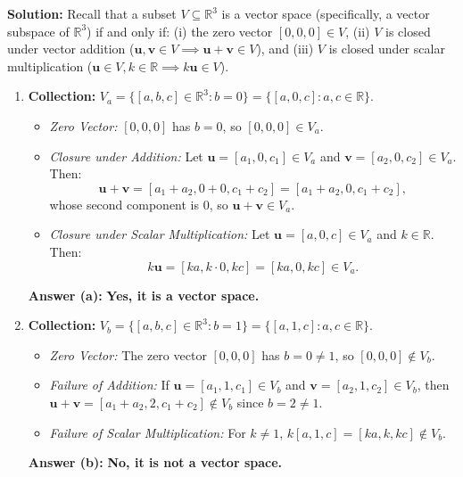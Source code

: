 \documentclass[11pt,a4paper]{article}
\begin{document}
\textbf{Solution:}
Recall that a subset $V \subseteq \mathbb{R}^3$ is a vector space (specifically, a vector subspace of $\mathbb{R}^3$) if and only if: (i) the zero vector $[0, 0, 0] \in V$, (ii) $V$ is closed under vector addition ($\mathbf{u}, \mathbf{v} \in V \implies \mathbf{u} + \mathbf{v} \in V$), and (iii) $V$ is closed under scalar multiplication ($\mathbf{u} \in V, k \in \mathbb{R} \implies k\mathbf{u} \in V$).

\begin{enumerate}[label=(\alph*)]
    \item \textbf{Collection:} $V_a = \{[a, b, c] \in \mathbb{R}^3 : b = 0\} = \{[a, 0, c] : a, c \in \mathbb{R}\}$.
    \begin{itemize}
        \item \emph{Zero Vector:} $[0, 0, 0]$ has $b = 0$, so $[0, 0, 0] \in V_a$.
        \item \emph{Closure under Addition:} Let $\mathbf{u} = [a_1, 0, c_1] \in V_a$ and $\mathbf{v} = [a_2, 0, c_2] \in V_a$. Then:
        \[
            \mathbf{u} + \mathbf{v} = [a_1 + a_2, 0 + 0, c_1 + c_2] = [a_1 + a_2, 0, c_1 + c_2],
        \]
        whose second component is $0$, so $\mathbf{u} + \mathbf{v} \in V_a$.
        \item \emph{Closure under Scalar Multiplication:} Let $\mathbf{u} = [a, 0, c] \in V_a$ and $k \in \mathbb{R}$. Then:
        \[
            k\mathbf{u} = [ka, k\cdot 0, kc] = [ka, 0, kc] \in V_a.
        \]
    \end{itemize}
    \textbf{Answer (a):} \textbf{Yes, it is a vector space.}

    \item \textbf{Collection:} $V_b = \{[a, b, c] \in \mathbb{R}^3 : b = 1\} = \{[a, 1, c] : a, c \in \mathbb{R}\}$.
    \begin{itemize}
        \item \emph{Zero Vector:} The zero vector $[0, 0, 0]$ has $b = 0 \neq 1$, so $[0, 0, 0] \notin V_b$.
        \item \emph{Failure of Addition:} If $\mathbf{u} = [a_1, 1, c_1] \in V_b$ and $\mathbf{v} = [a_2, 1, c_2] \in V_b$, then $\mathbf{u} + \mathbf{v} = [a_1 + a_2, 2, c_1 + c_2] \notin V_b$ since $b = 2 \neq 1$.
        \item \emph{Failure of Scalar Multiplication:} For $k \neq 1$, $k[a, 1, c] = [ka, k, kc] \notin V_b$.
    \end{itemize}
    \textbf{Answer (b):} \textbf{No, it is not a vector space.}


\end{enumerate}
\end{document}
